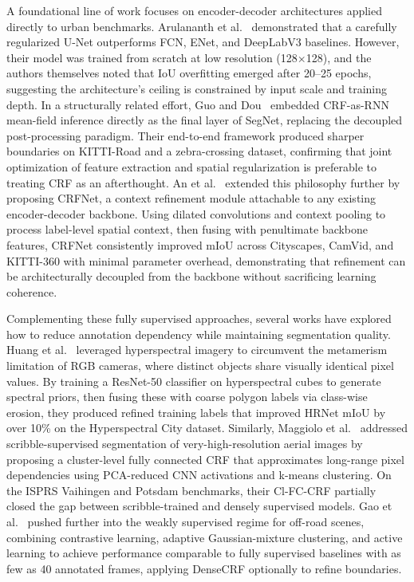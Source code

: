 \documentclass[conference]{IEEEtran}
\begin{document}
A foundational line of work focuses on encoder-decoder architectures applied directly to urban
benchmarks. Arulananth et al.~\cite{arulananth2024unet} demonstrated that a carefully regularized U-Net outperforms FCN,
ENet, and DeepLabV3 baselines. However, their model was trained from scratch at low resolution
(128$\times$128), and the authors themselves noted that IoU overfitting emerged after 20--25 epochs, suggesting
the architecture's ceiling is constrained by input scale and training depth. In a structurally related effort,
Guo and Dou~\cite{guo2021segnet} embedded CRF-as-RNN mean-field inference directly as the final layer of SegNet,
replacing the decoupled post-processing paradigm. Their end-to-end framework produced sharper
boundaries on KITTI-Road and a zebra-crossing dataset, confirming that joint optimization of feature
extraction and spatial regularization is preferable to treating CRF as an afterthought. An et al.~\cite{an2023crfnet} extended
this philosophy further by proposing CRFNet, a context refinement module attachable to any existing
encoder-decoder backbone. Using dilated convolutions and context pooling to process label-level spatial
context, then fusing with penultimate backbone features, CRFNet consistently improved mIoU across
Cityscapes, CamVid, and KITTI-360 with minimal parameter overhead, demonstrating that refinement
can be architecturally decoupled from the backbone without sacrificing learning coherence.

Complementing these fully supervised approaches, several works have explored how to reduce annotation
dependency while maintaining segmentation quality. Huang et al.~\cite{huang2021hyperspectral} leveraged hyperspectral imagery to
circumvent the metamerism limitation of RGB cameras, where distinct objects share visually identical
pixel values. By training a ResNet-50 classifier on hyperspectral cubes to generate spectral priors, then
fusing these with coarse polygon labels via class-wise erosion, they produced refined training labels that
improved HRNet mIoU by over 10\% on the Hyperspectral City dataset. Similarly, Maggiolo et al.~\cite{maggiolo2021semisupervised}
addressed scribble-supervised segmentation of very-high-resolution aerial images by proposing a cluster-level fully connected CRF that approximates long-range pixel dependencies using PCA-reduced CNN
activations and k-means clustering. On the ISPRS Vaihingen and Potsdam benchmarks, their Cl-FC-CRF
partially closed the gap between scribble-trained and densely supervised models. Gao et al.~\cite{gao2022offroad} pushed
further into the weakly supervised regime for off-road scenes, combining contrastive learning, adaptive
Gaussian-mixture clustering, and active learning to achieve performance comparable to fully supervised
baselines with as few as 40 annotated frames, applying DenseCRF optionally to refine boundaries.
\end{document}
